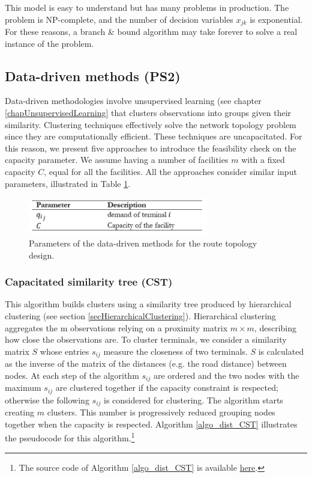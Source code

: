 This model is easy to understand but has many problems in production. The problem is NP-complete, and the number of decision variables $x_{jk}$ is exponential. For these reasons, a branch \& bound algorithm may take forever to solve a real instance of the problem. 

\subsection{Data-driven methods (PS2)}

Data-driven methodologies involve unsupervised learning (see chapter \ref{chapUnsupervisedLearning} that clusters observations into groups given their similarity. Clustering techniques effectively solve the network topology problem since they are computationally efficient. These techniques are uncapacitated. For this reason, we present five approaches to introduce the feasibility check on the capacity parameter. We assume having a number of facilities $m$ with a fixed capacity $C$, equal for all the facilities. All the approaches consider similar input parameters, illustrated in Table \ref{tab_nodeClustering}.

\begin{figure}[hbt!]
\centering
\includegraphics[width=0.7\textwidth]{SectionDistribution/design_figures/tab_nodeClustering.png}
\captionsetup{type=table}
\caption{Parameters of the data-driven methods for the route topology design.}
\label{tab_nodeClustering}
\end{figure}

\subsubsection{Capacitated similarity tree (CST)}
This algorithm builds clusters using a similarity tree produced by hierarchical clustering (see section \ref{secHierarchicalClustering}). Hierarchical clustering aggregates the m observations relying on a proximity matrix $m \times m$, describing how close the observations are. To cluster terminals, we consider a similarity matrix $S$ whose entries $s_{ij}$ measure the closeness of two terminals. $S$ is calculated as the inverse of the matrix of the distances (e.g. the road distance) between nodes. At each step of the algorithm $s_{ij}$ are ordered and the two nodes with the maximum $s_{ij}$ are clustered together if the capacity constraint is respected; otherwise the following $s_{ij}$ is considered for clustering. The algorithm starts creating $m$ clusters. This number is progressively reduced grouping nodes together when the capacity is respected. Algorithm \ref{algo_dist_CST} illustrates the pseudocode for this algorithm.\footnote{The source code of Algorithm \ref{algo_dist_CST} is available \href{https://github.com/aletuf93/logproj/blob/master/logproj/ml_unsupervised_models.py}{here}.} 

